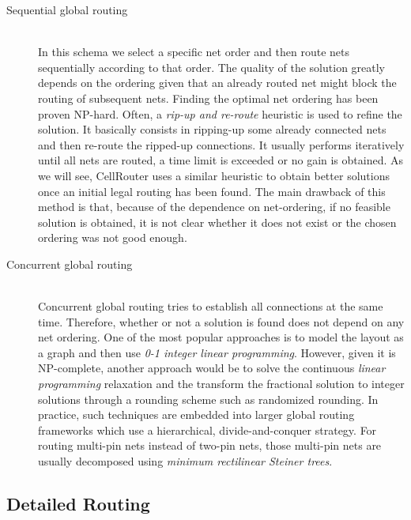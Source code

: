 \begin{description}
  \item[Sequential global routing] \hfill \\
	In this schema we select a specific net order and then route nets sequentially according to that order. The quality of the solution greatly depends on the ordering given that an already routed net might block the routing of subsequent nets. Finding the optimal net ordering has been proven NP-hard. Often, a \textit{rip-up and re-route} heuristic is used to refine the solution. It basically consists in ripping-up some already connected nets and then re-route the ripped-up connections. It usually performs iteratively until all nets are routed, a time limit is exceeded or no gain is obtained. As we will see, CellRouter uses a similar heuristic to obtain better solutions once an initial legal routing has been found. The main drawback of this method is that, because of the dependence on net-ordering, if no feasible solution is obtained, it is not clear whether it does not exist or the chosen ordering was not good enough. 
  \item[Concurrent global routing] \hfill \\
	Concurrent global routing tries to establish all connections at the same time. Therefore, whether or not a solution is found does not depend on any net ordering. One of the most popular approaches is to model the layout as a graph and then use \textit{0-1 integer linear programming}. However, given it is NP-complete, another approach would be to solve the continuous \textit{linear programming} relaxation and the transform the fractional solution to integer solutions through a rounding scheme such as randomized rounding. In practice, such techniques are embedded into larger global routing frameworks which use a hierarchical, divide-and-conquer strategy. For routing multi-pin nets instead of two-pin nets, those multi-pin nets are usually decomposed using \textit{minimum rectilinear Steiner trees}.
  
\end{description}


\subsection{Detailed Routing}

